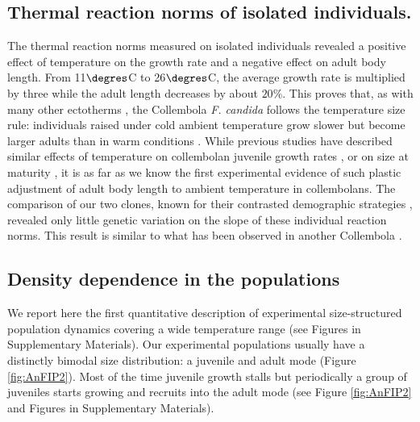\subsection{Thermal reaction norms of isolated individuals.}

The thermal reaction norms measured on isolated individuals revealed a positive
effect of temperature on the growth rate and a negative effect on adult body
length. From 11$\degres$C to 26$\degres$C, the average growth rate is multiplied
by three while the adult length decreases by about $20\%$. This proves that, as
with many other ectotherms \autocites{atkinson1994a,angilletta2009a}, the
Collembola \textit{F. candida} follows the temperature size rule: individuals
raised under cold ambient temperature grow slower but become larger adults
than in warm conditions \autocites{angilletta2003a}. While previous studies have
described similar effects of temperature on collembolan juvenile growth rates
\autocites{birkemoe2000a,driessen2007a,ellers2008a,ellers2011b}, or on size at
maturity \autocites{stam1996a}, it is as far as we know the first experimental
evidence of such plastic adjustment of adult body length to ambient temperature
in collembolans. The comparison of our two clones, known for their contrasted
demographic strategies \autocites{tully2008a,tully2011a}, revealed only little
genetic variation on the slope of these individual reaction norms. This result
is similar to what has been observed in another Collembola \autocites{driessen2007a}.

\subsection{Density dependence in the populations}

We report here the first quantitative description of experimental
size-structured population dynamics covering a wide temperature range (see
Figures in Supplementary Materials).
Our experimental populations usually have a distinctly bimodal size
distribution: a juvenile and adult mode (Figure \ref{fig:AnFIP2}). Most of the time
juvenile growth stalls but periodically a group of juveniles starts growing and recruits
into the adult mode (see Figure \ref{fig:AnFIP2} and
Figures in Supplementary Materials).

